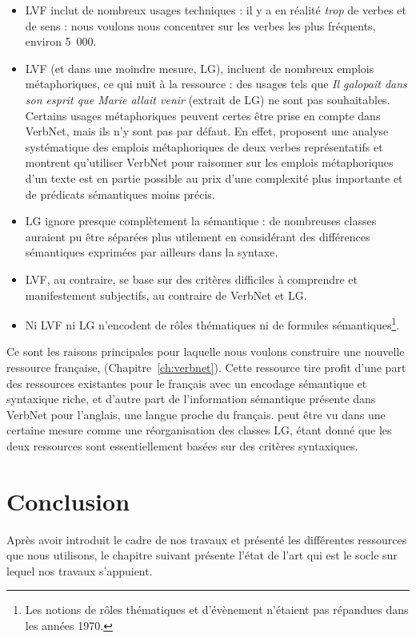 \begin{itemize}
    \item LVF inclut de nombreux usages techniques : il y a en réalité
        \emph{trop} de verbes et de sens : nous voulons nous concentrer sur les
        verbes les plus fréquents, environ 5~000.
    \item LVF (et dans une moindre mesure, LG), incluent de nombreux emplois
        métaphoriques, ce qui nuit à la ressource : des usages tels que
        \textit{Il galopait dans son esprit que Marie allait venir} (extrait de
        LG) ne sont pas souhaitables. Certains usages métaphoriques peuvent
        certes être prise en compte dans VerbNet, mais ils n'y sont pas par
        défaut. En effet, \cite{brown2012semantic} proposent une analyse
        systématique des emplois métaphoriques de deux verbes représentatifs et
        montrent qu'utiliser VerbNet pour raisonner sur les emplois
        métaphoriques d'un texte est en partie possible au prix d'une complexité
        plus importante et de prédicats sémantiques moins précis.
    \item LG ignore presque complètement la sémantique : de nombreuses classes
        auraient pu être séparées plus utilement en considérant des différences
        sémantiques exprimées par ailleurs dans la syntaxe.
    \item LVF, au contraire, se base sur des critères difficiles à comprendre et
        manifestement subjectifs, au contraire de VerbNet et LG.
    \item Ni LVF ni LG n'encodent de rôles thématiques ni de formules
        sémantiques\footnote{Les notions de rôles thématiques et d'évènement
        n'étaient pas répandues dans les années 1970.}.
\end{itemize}

Ce sont les raisons principales pour laquelle nous voulons construire une
nouvelle ressource française, \verbenet{} (Chapitre~\ref{ch:verbnet}). Cette
ressource tire profit d'une part des ressources existantes pour le français
avec un encodage sémantique et syntaxique riche, et d'autre part de
l'information sémantique présente dans VerbNet pour l'anglais, une langue
proche du français. \verbenet{} peut être vu dans une certaine mesure comme une
réorganisation des classes LG, étant donné que les deux ressources sont
essentiellement basées sur des critères syntaxiques.

\section*{Conclusion}

Après avoir introduit le cadre de nos travaux et présenté les différentes
ressources que nous utilisons, le chapitre suivant présente l'état de l'art qui
est le socle sur lequel nos travaux s'appuient.
